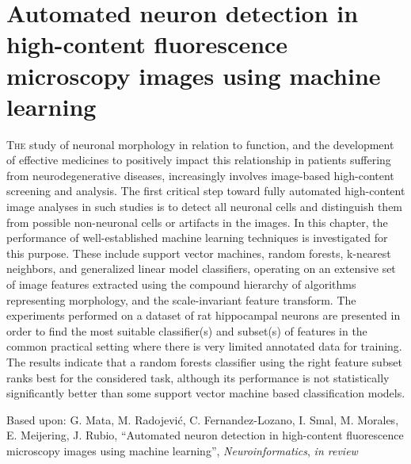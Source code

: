 %
%
\chpos{15mm}{8mm}
\chapter[Automated neuron detection in high-content fluorescence microscopy images using machine learning]{Automated neuron detection in high-content fluorescence microscopy images using machine learning}
\label{ch5:ndetchml}
{\small \lettrine{T}{he} study of neuronal morphology in relation to function, and the development of effective medicines to positively impact this relationship in patients suffering from neurodegenerative diseases, increasingly involves image-based high-content screening and analysis. The first critical step toward fully automated high-content image analyses in such studies is to detect all neuronal cells and distinguish them from possible non-neuronal cells or artifacts in the images. In this chapter, the performance of well-established machine learning techniques is investigated for this purpose. These include support vector machines, random forests, k-nearest neighbors, and generalized linear model classifiers, operating on an extensive set of image features extracted using the compound hierarchy of algorithms representing morphology, and the scale-invariant feature transform. The experiments performed on a dataset of rat hippocampal neurons are presented in order to find the most suitable classifier(s) and subset(s) of features in the common practical setting where there is very limited annotated data for training. The results indicate that a random forests classifier using the right feature subset ranks best for the considered task, although its performance is not statistically significantly better than some support vector machine based classification models.\par}
\vspace*{12em}
\begin{publish}
	Based upon: G. Mata, M. Radojevi\'{c}, C. Fernandez-Lozano, I. Smal, M. Morales, E. Meijering, J. Rubio, ``Automated neuron detection in high-content fluorescence microscopy images using machine learning'', \textit{Neuroinformatics}, \textit{in review}
\end{publish}%

